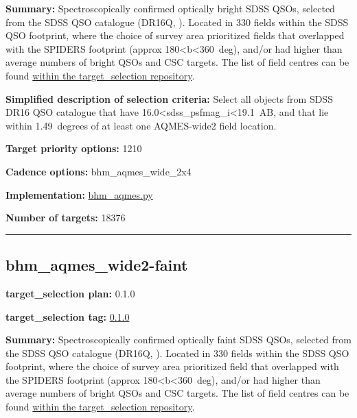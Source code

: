 \noindent\textbf{Summary:} Spectroscopically confirmed optically bright SDSS
QSOs, selected from the SDSS QSO catalogue (DR16Q,
\citealt{Lyke2020}). Located in 330 fields within the SDSS QSO footprint,
where the choice of survey area prioritized fields that overlapped with
the SPIDERS footprint (approx 180\textless b\textless360~deg), and/or
had higher than average numbers of bright QSOs and CSC targets. The list
of field centres can be found
\href{https://github.com/sdss/target_selection/blob/0.1.0/python/target_selection/masks/candidate_target_fields_bhm_aqmes_wide_v0.2.1.fits}{within
the target\_selection repository}.

\noindent\textbf{Simplified description of selection criteria:} Select all
objects from SDSS DR16 QSO catalogue that have
16.0\textless sdss\_psfmag\_i\textless19.1~AB, and that lie within
1.49~degrees of at least one AQMES-wide2 field location.


\noindent\textbf{Target priority options:} 1210

\noindent\textbf{Cadence options:} bhm\_aqmes\_wide\_2x4

\noindent\textbf{Implementation:}
\href{https://github.com/sdss/target_selection/blob/0.1.0/python/target_selection/cartons/bhm_aqmes.py}{bhm\_aqmes.py}

\noindent\textbf{Number of targets:} 18376

\begin{center}\rule{0.5\linewidth}{0.5pt}\end{center}

\hypertarget{bhm_aqmes_wide2-faint_plan0.1.0}{%
\subsection{bhm\_aqmes\_wide2-faint}\label{bhm_aqmes_wide2-faint_plan0.1.0}}

\noindent\textbf{target\_selection plan:} 0.1.0

\noindent\textbf{target\_selection tag:}
\href{https://github.com/sdss/target_selection/tree/0.1.0/}{0.1.0}

\noindent\textbf{Summary:} Spectroscopically confirmed optically faint SDSS QSOs,
selected from the SDSS QSO catalogue (DR16Q,
\citealt{Lyke2020}). Located in 330 fields within the SDSS QSO footprint,
where the choice of survey area prioritized field that overlapped with
the SPIDERS footprint (approx 180\textless b\textless360~deg), and/or
had higher than average numbers of bright QSOs and CSC targets. The list
of field centres can be found
\href{https://github.com/sdss/target_selection/blob/0.1.0/python/target_selection/masks/candidate_target_fields_bhm_aqmes_wide_v0.2.1.fits}{within
the target\_selection repository}.

